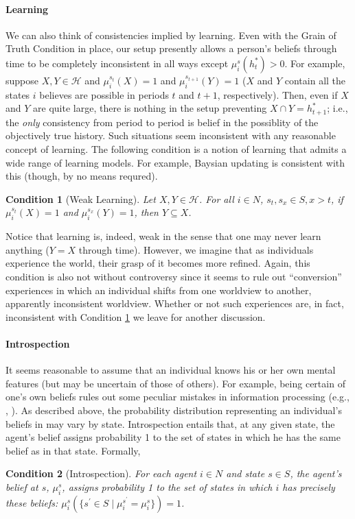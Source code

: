 \documentclass[
11pt,
titlepage,
reqno,
]{article}%
\newtheorem{condition}{Condition}
\theoremstyle{definition}
\begin{document}
	\paragraph{Learning\label{para: learning}}
	We can also think of consistencies implied by learning. 
	Even with the Grain of Truth Condition in place, our setup presently allows a person's beliefs through time to be completely inconsistent in all ways except $\mu_i^s(h^\ast_t)>0$. 
	For example, suppose $X,Y\in \mathcal{H}$ and $\mu_i^{s_t}(X)=1$ and $\mu_i^{s_{t+1}}(Y)=1$ ($X$ and $Y$ contain all the states $i$ believes are possible in periods $t$ and $t+1$, respectively). 
	Then, even if $X$ and $Y$ are quite large, there is nothing in the setup preventing $X\cap Y= h^\ast_{t+1}$; i.e., the \textit{only} consistency from period to period is belief in the possiblity of the objectively true history.
	Such situations seem inconsistent with any reasonable concept of learning. 
	The following condition is a notion of learning that admits a wide range of learning models.
	For example, Baysian updating is consistent with this (though, by no means requred).
	\begin{condition}[Weak Learning]\label{cond: weak learning}
		Let $X,Y\in \mathcal{H}$. For all $i\in N$, $s_t,s_x\in S, x>t$, if $\mu_i^{s_t}(X)=1$ and $\mu_i^{s_x}(Y)=1$, then $Y\subseteq X$.
	\end{condition}
	\noindent Notice that learning is, indeed, weak in the sense that one may never learn anything ($Y=X$ through time).
	However, we imagine that as individuals experience the world, their grasp of it becomes more refined. 
	Again, this condition is also not without controversy since it seems to rule out ``conversion'' experiences in which an individual shifts from one worldview to another, apparently inconsistent worldview.
	Whether or not such experiences are, in fact, inconsistent with Condition \ref{cond: weak learning} we leave for another discussion.
	
	\paragraph{Introspection\label{para: introspecton}} 
	It seems reasonable to assume that an individual knows his or her own mental features (but may be uncertain of those of others). 
	For example, being certain of one's own beliefs rules out some peculiar mistakes in information processing (e.g., \citet{Geanakoplos1989}, \citet{Samet1990}). 
	As described above, the probability distribution representing an individual’s beliefs in may vary by state.  
	Introspection entails that, at any given state, the agent's belief assigns probability 1 to the set of states in which he has the same belief as in that state. Formally, 
	\begin{condition}[Introspection]\label{cond: introspection}
		For each agent $i \in N$ and  state $ s \in S$, the agent's belief at $s$, $\mu_i^s$, assigns probability 1 to the set of states in which  $i$ has precisely these beliefs: 
		$\mu_i^s(\{s^\prime \in S \mid \mu_i^{s^\prime} = \mu_i^s\})=1$. 
	\end{condition}
	
\end{document}
